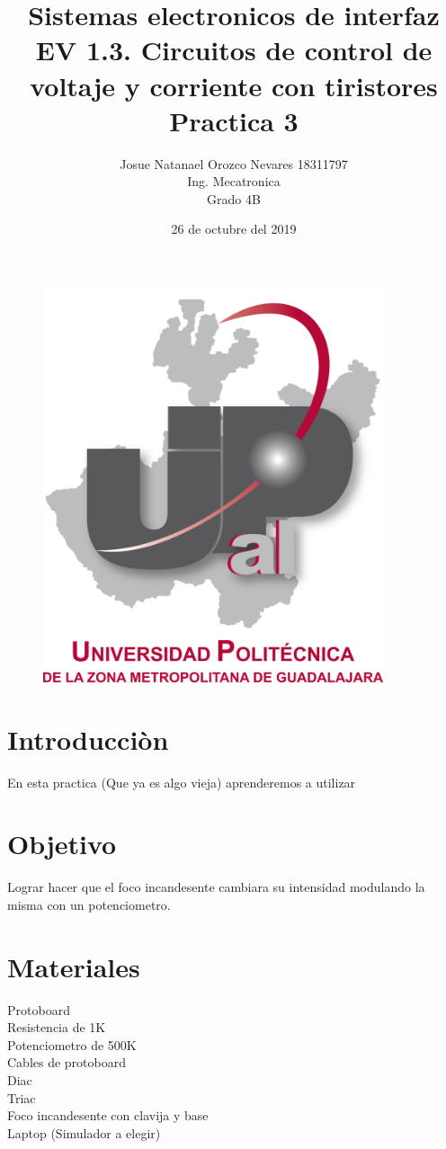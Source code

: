 \documentclass[12pt,a4paper]{article}
\begin{document}
\title{\textbf{Sistemas electronicos de interfaz\\EV 1.3. Circuitos de control de voltaje y corriente con tiristores\\Practica 3}}
\author{Josue Natanael Orozco Nevares 18311797\\Ing. Mecatronica\\Grado 4B}
\date{26 de octubre del 2019}
\maketitle
\begin{figure}[h!]
\centering
\includegraphics[width=10cm]{UPCDLZMDG5783-logo.png} 
\end{figure}
\newpage

\section{Introducciòn}
En esta practica (Que ya es algo vieja) aprenderemos a utilizar 

\section{Objetivo}
Lograr hacer que el foco incandesente cambiara su intensidad modulando la misma con un potenciometro.

\section{Materiales}
Protoboard\\Resistencia de 1K\\Potenciometro de 500K\\Cables de protoboard\\Diac\\Triac\\Foco incandesente con clavija y base\\Laptop (Simulador a elegir)
\end{document}
